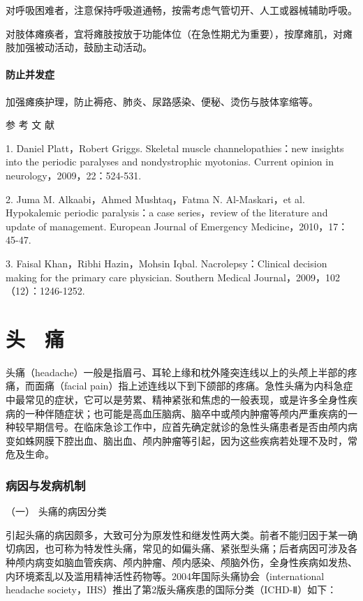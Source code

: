 对呼吸困难者，注意保持呼吸道通畅，按需考虑气管切开、人工或器械辅助呼吸。

对肢体瘫痪者，宜将瘫肢按放于功能体位（在急性期尤为重要），按摩瘫肌，对瘫肢加强被动活动，鼓励主动活动。

\subsubsection{防止并发症}

加强瘫痪护理，防止褥疮、肺炎、尿路感染、便秘、烫伤与肢体挛缩等。


\hypertarget{text00019.htmlux5cux23CHP1-6-4}{}
参 考 文 献

1. Daniel Platt，Robert Griggs. Skeletal muscle channelopathies：new
insights into the periodic paralyses and nondystrophic myotonias.
Current opinion in neurology，2009，22：524-531.

2. Juma M. Alkaabi，Ahmed Mushtaq，Fatma N. Al-Maskari，et al.
Hypokalemic periodic paralysis：a case series，review of the literature
and update of management. European Journal of Emergency
Medicine，2010，17：45-47.

3. Faisal Khan，Ribhi Hazin，Mohsin Iqbal. Nacrolepsy：Clinical decision
making for the primary care physician. Southern Medical
Journal，2009，102（12）：1246-1252.

\protect\hypertarget{text00020.html}{}{}

\chapter{头　痛}

头痛（headache）一般是指眉弓、耳轮上缘和枕外隆突连线以上的头颅上半部的疼痛，而面痛（facial
pain）指上述连线以下到下颌部的疼痛。急性头痛为内科急症中最常见的症状，它可以是劳累、精神紧张和焦虑的一般表现，或是许多全身性疾病的一种伴随症状；也可能是高血压脑病、脑卒中或颅内肿瘤等颅内严重疾病的一种较早期信号。在临床急诊工作中，应首先确定就诊的急性头痛患者是否由颅内病变如蛛网膜下腔出血、脑出血、颅内肿瘤等引起，因为这些疾病若处理不及时，常危及生命。

\subsection{病因与发病机制}

\hypertarget{text00020.htmlux5cux23CHP1-7-1-1}{}
（一） 头痛的病因分类

引起头痛的病因颇多，大致可分为原发性和继发性两大类。前者不能归因于某一确切病因，也可称为特发性头痛，常见的如偏头痛、紧张型头痛；后者病因可涉及各种颅内病变如脑血管疾病、颅内肿瘤、颅内感染、颅脑外伤，全身性疾病如发热、内环境紊乱以及滥用精神活性药物等。2004年国际头痛协会（international
headache society，IHS）推出了第2版头痛疾患的国际分类（ICHD-Ⅱ）如下：

